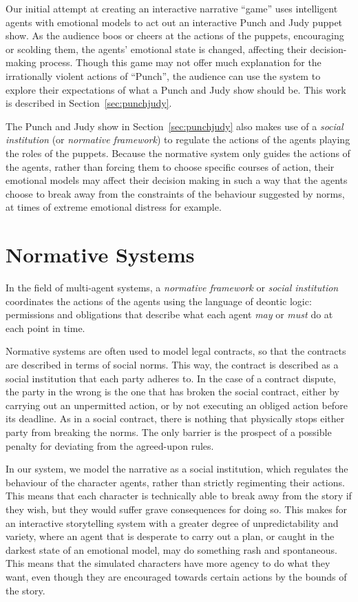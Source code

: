 \documentclass[11pt]{report}
\begin{document}
Our initial attempt at creating an interactive narrative ``game'' uses
intelligent agents with emotional models to act out an interactive Punch and
Judy puppet show. As the audience boos or cheers at the actions of the puppets,
encouraging or scolding them, the agents' emotional state is changed, affecting
their decision-making process. Though this game may not offer much explanation
for the irrationally violent actions of ``Punch'', the audience can use the
system to explore
their expectations of what a Punch and Judy show should be. This work is
described in Section~\ref{sec:punchjudy}.

The Punch and Judy show in Section~\ref{sec:punchjudy} also makes use of a
\emph{social institution} (or \emph{normative framework}) to regulate the
actions of the agents playing the roles of the puppets. Because the normative
system only guides the actions of the agents, rather than forcing them to choose
specific courses of action, their emotional models may affect their decision
making in such a way that the agents choose to break away from the constraints
of the behaviour suggested by norms, at times of extreme emotional distress for
example.

\section{Normative Systems}
\label{sec:normative-intro}
In the field of multi-agent systems, a \emph{normative framework} or
\emph{social institution} coordinates the actions of the agents using the
language of deontic logic: permissions and obligations that describe what each
agent \emph{may} or \emph{must} do at each point in time.

Normative systems are often used to model legal contracts, so that the contracts
are described in terms of social norms. This way, the contract is described as a
social institution that each party adheres to. In the case of a contract
dispute, the party in the wrong is the one that has broken the social contract,
either by carrying out an unpermitted action, or by not executing an obliged
action before its deadline. As in a social contract, there is nothing that
physically stops either party from breaking the norms. The only barrier is the
prospect of a possible penalty for deviating from the agreed-upon rules.

In our system, we model the narrative as a social institution, which regulates
the behaviour of the character agents, rather than strictly regimenting their
actions. This means that each character is technically able to break away from
the story if they wish, but they would suffer grave consequences for doing so.
This makes for an interactive storytelling system with a greater degree of
unpredictability and variety, where an agent that is desperate to carry out a
plan, or caught in the darkest state of an emotional model, may do something
rash and spontaneous. This means that the simulated characters have more agency
to do what they want, even though they are encouraged towards certain actions by
the bounds of the story.
\end{document}
